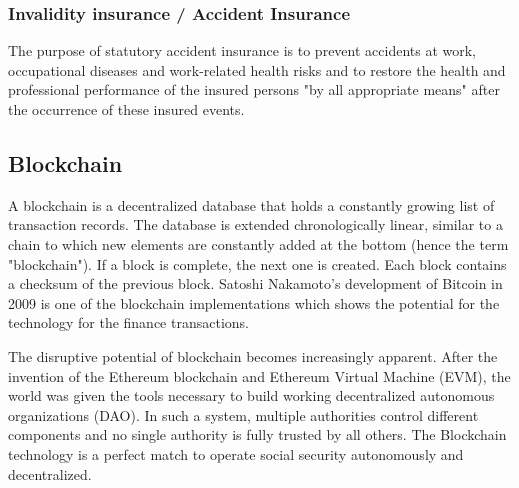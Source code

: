 \subsubsection*{Invalidity insurance / Accident Insurance}
The purpose of statutory accident insurance is to prevent accidents at work, occupational diseases and work-related health risks and to restore the health and professional performance of the insured persons "by all appropriate means" after the occurrence of these insured events.

\subsection{Blockchain}
A blockchain is a decentralized database that holds a constantly growing list of transaction records. The database is extended chronologically linear, similar to a chain to which new elements are constantly added at the bottom (hence the term "blockchain"). If a block is complete, the next one is created. Each block contains a checksum of the previous block. Satoshi Nakamoto's development of Bitcoin in 2009 is one of the blockchain implementations which shows the potential for the technology for the finance transactions. \cite{bitcoin}

The disruptive potential of blockchain becomes increasingly apparent. After the invention of the Ethereum blockchain and Ethereum Virtual Machine (EVM), the world was given the tools necessary to build working decentralized autonomous organizations (DAO). In such a system, multiple authorities control different components and no single authority is fully trusted by all others. \cite{cammarden} The Blockchain technology is a perfect match to operate social security autonomously and decentralized.
